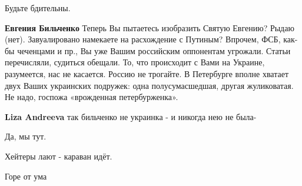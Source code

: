 \begin{itemize}
\begin{itemize}
Будьте бдительны.

 

\textbf{Евгения Бильченко} Теперь Вы пытаетесь изобразить Святую Евгению? Рыдаю (нет).
Завуалировано намекаете на расхождение с Путиным? Впрочем, ФСБ, как-бы
чеченцами и пр., Вы уже Вашим российским оппонентам угрожали. Статьи
перечисляли, судиться обещали. То, что происходит с Вами на Украине,
разумеется, нас не касается. Россию не трогайте. В Петербурге вполне хватает
двух Ваших украинских подружек: одна полусумасшедшая, другая жуликоватая. Не
надо, госпожа «врожденная петербурженка».


 
\textbf{Liza Andreeva} так бильченко не украинка - и никогда нею не была-

\end{itemize}

 
Да, мы тут.

 
Хейтеры лают - караван идёт.

 
Горе от ума

\begin{itemize}
 

\end{itemize}
\end{itemize}
